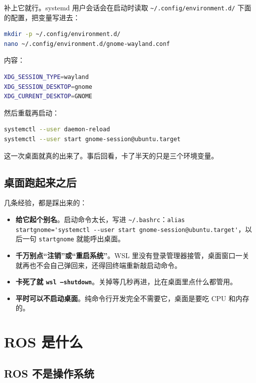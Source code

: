 \documentclass[12pt,a4paper]{ctexbook}
\begin{document}
补上它就行。systemd 用户会话会在启动时读取 \verb|~/.config/environment.d/| 下面的配置，把变量写进去：

\begin{lstlisting}[language=bash,title={补上缺失的会话类型变量}]
mkdir -p ~/.config/environment.d/
nano ~/.config/environment.d/gnome-wayland.conf
\end{lstlisting}

内容：

\begin{lstlisting}[language=bash,title={gnome-wayland.conf}]
XDG_SESSION_TYPE=wayland
XDG_SESSION_DESKTOP=gnome
XDG_CURRENT_DESKTOP=GNOME
\end{lstlisting}

然后重载再启动：

\begin{lstlisting}[language=bash,title={重新拉起桌面}]
systemctl --user daemon-reload
systemctl --user start gnome-session@ubuntu.target
\end{lstlisting}

这一次桌面就真的出来了。事后回看，卡了半天的只是三个环境变量。

\subsection{桌面跑起来之后}

几条经验，都是踩出来的：

\begin{itemize}
    \item \textbf{给它起个别名}。启动命令太长，写进 \verb|~/.bashrc|：\verb|alias startgnome='systemctl --user start gnome-session@ubuntu.target'|，以后一句 \verb|startgnome| 就能呼出桌面。
    \item \textbf{千万别点``注销''或``重启系统''}。WSL 里没有登录管理器接管，桌面窗口一关就再也不会自己弹回来，还得回终端重新敲启动命令。
    \item \textbf{卡死了就 \texttt{wsl --shutdown}}。关掉等几秒再进，比在桌面里点什么都管用。
    \item \textbf{平时可以不启动桌面}。纯命令行开发完全不需要它，桌面是要吃 CPU 和内存的。
\end{itemize}

\section{ROS 是什么}

\subsection{ROS 不是操作系统}
\end{document}
